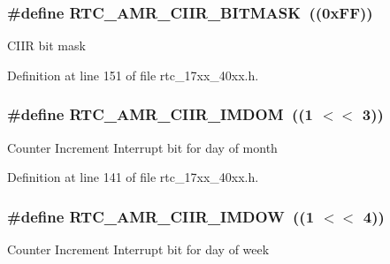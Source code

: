 \subsubsection[{\texorpdfstring{R\+T\+C\+\_\+\+A\+M\+R\+\_\+\+C\+I\+I\+R\+\_\+\+B\+I\+T\+M\+A\+SK}{RTC_AMR_CIIR_BITMASK}}]{\setlength{\rightskip}{0pt plus 5cm}\#define R\+T\+C\+\_\+\+A\+M\+R\+\_\+\+C\+I\+I\+R\+\_\+\+B\+I\+T\+M\+A\+SK~((0x\+F\+F))}\hypertarget{group__RTC__17XX__40XX_gafcc754fba01521c5aa4f1775b889e894}{}\label{group__RTC__17XX__40XX_gafcc754fba01521c5aa4f1775b889e894}
C\+I\+IR bit mask 

Definition at line 151 of file rtc\+\_\+17xx\+\_\+40xx.\+h.

\subsubsection[{\texorpdfstring{R\+T\+C\+\_\+\+A\+M\+R\+\_\+\+C\+I\+I\+R\+\_\+\+I\+M\+D\+OM}{RTC_AMR_CIIR_IMDOM}}]{\setlength{\rightskip}{0pt plus 5cm}\#define R\+T\+C\+\_\+\+A\+M\+R\+\_\+\+C\+I\+I\+R\+\_\+\+I\+M\+D\+OM~((1 $<$$<$ 3))}\hypertarget{group__RTC__17XX__40XX_gacd23cffe1367b6bb612fb37ebdf2e279}{}\label{group__RTC__17XX__40XX_gacd23cffe1367b6bb612fb37ebdf2e279}
Counter Increment Interrupt bit for day of month 

Definition at line 141 of file rtc\+\_\+17xx\+\_\+40xx.\+h.

\subsubsection[{\texorpdfstring{R\+T\+C\+\_\+\+A\+M\+R\+\_\+\+C\+I\+I\+R\+\_\+\+I\+M\+D\+OW}{RTC_AMR_CIIR_IMDOW}}]{\setlength{\rightskip}{0pt plus 5cm}\#define R\+T\+C\+\_\+\+A\+M\+R\+\_\+\+C\+I\+I\+R\+\_\+\+I\+M\+D\+OW~((1 $<$$<$ 4))}\hypertarget{group__RTC__17XX__40XX_ga6494d5878d87398a4519e90a367bffe5}{}\label{group__RTC__17XX__40XX_ga6494d5878d87398a4519e90a367bffe5}
Counter Increment Interrupt bit for day of week 


